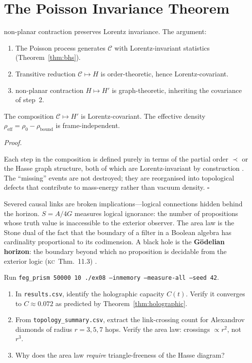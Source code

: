 \documentclass[11pt, a4paper, openany]{book}
\newcommand{\KC}[1]{\textnormal{(\textsc{kc}~#1)}}
\newcounter{thm}[chapter]
\renewenvironment{proof}[1][Proof]{%
  \par\noindent\textit{#1.}\quad
}{\hfill$\square$\par\medskip}
\begin{document}
\section{The Poisson Invariance Theorem}\label{sec:poisson-invariance}

\begin{theorem}\label{thm:poisson-invariance}
non-planar contraction preserves Lorentz invariance. The argument:
\begin{enumerate}
  \item The Poisson process generates $\mathcal{C}$ with Lorentz-invariant
    statistics (Theorem~\ref{thm:bhs}).
  \item Transitive reduction $\mathcal{C} \mapsto H$ is order-theoretic,
    hence Lorentz-covariant.
  \item non-planar contraction $H \mapsto H'$ is graph-theoretic, inheriting
    the covariance of step~2.
\end{enumerate}
The composition $\mathcal{C} \mapsto H'$ is Lorentz-covariant. The
effective density $\rho_{\mathrm{eff}} = \rho_0 - \rho_{\mathrm{bound}}$
is frame-independent.
\end{theorem}

\begin{proof}
Each step in the composition is defined purely in terms of the partial
order $\prec$ or the Hasse graph structure, both of which are
Lorentz-invariant by construction \cite{bombelli1987}. The ``missing''
events are not destroyed; they are reorganised into topological defects
that contribute to mass-energy rather than vacuum density.
\end{proof}

\begin{logicalreading}
Severed causal links are broken implications---logical connections hidden
behind the horizon. $S = A/4G$ measures logical ignorance: the number of
propositions whose truth value is inaccessible to the exterior observer.
The area law is the Stone dual of the fact that the boundary of a filter
in a Boolean algebra has cardinality proportional to its codimension.
A black hole is the \textbf{G\"odelian horizon}: the boundary beyond
which no proposition is decidable from the exterior logic
\KC{Thm.~11.3} \cite{stone1936,dou2003}.
\end{logicalreading}


\begin{simulation}
Run \texttt{feg\_prism 50000 10 ./ex08 --inmemory --measure-all --seed 42}.
\begin{enumerate}
\item In \texttt{results.csv}, identify the holographic capacity $C(t)$. Verify it converges to $C \approx 0.072$ as predicted by Theorem~\ref{thm:holographic}.
\item From \texttt{topology\_summary.csv}, extract the link-crossing count for Alexandrov diamonds of radius $r = 3, 5, 7$ hops. Verify the area law: crossings $\propto r^2$, not $r^3$.
\item Why does the area law \emph{require} triangle-freeness of the Hasse diagram?
\end{enumerate}
\end{simulation}
\end{document}
